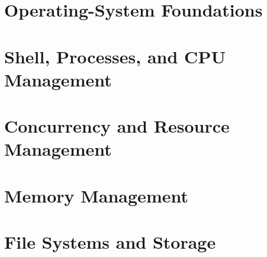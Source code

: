 \documentclass[11pt,oneside,a4paper]{report}
\begin{document}
\hypersetup{pageanchor=false}



\cleardoublepage
{}
\setcounter{tocdepth}{0}
\begingroup
\small
\setlength{\parskip}{0pt}
\tableofcontents
\endgroup
\newpage
\hypersetup{pageanchor=true}



\cleardoublepage
{}

\part{Operating-System Foundations}



\part{Shell, Processes, and CPU Management}



\part{Concurrency and Resource Management}



\part{Memory Management}



\part{File Systems and Storage}




\end{document}
